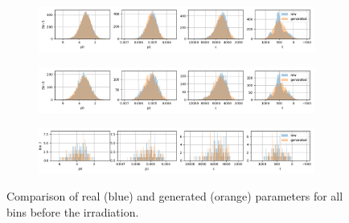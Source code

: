 \begin{figure}[H]
\begin{subfigure}[b]{\textwidth}
  \end{subfigure}
\begin{subfigure}[b]{\textwidth}
    \centering
    \includegraphics[width=\linewidth]{figures/chapter4/surrogates/p3_histos_pre_5.png}
  \end{subfigure}
\begin{subfigure}[b]{\textwidth}
    \centering
    \includegraphics[width=\linewidth]{figures/chapter4/surrogates/p3_histos_pre_6.png}
  \end{subfigure}
\begin{subfigure}[b]{\textwidth}
    \centering
    \includegraphics[width=\linewidth]{figures/chapter4/surrogates/p3_histos_pre_7.png}
  \end{subfigure}
  \caption[model pre ir]{Comparison of real (blue) and generated (orange) parameters for all bins before the irradiation.}
  \label{plot:model_s8_pre}
\end{figure}

